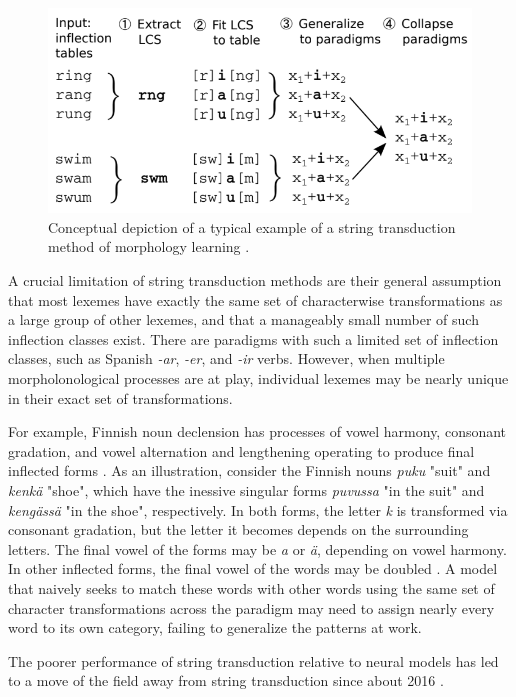 \begin{figure}[ht]
\includegraphics[width=12cm]{images/Hulden2014_diagram.png}
\centering
\caption{Conceptual depiction of a typical example of a string transduction method of morphology learning \parencite{Hulden2014}.}
\end{figure}

A crucial limitation of string transduction methods are their general assumption that most lexemes have exactly the same set of characterwise transformations as a large group of other lexemes, and that a manageably small number of such inflection classes exist. There are paradigms with such a limited set of inflection classes, such as Spanish \textit{-ar}, \textit{-er}, and \textit{-ir} verbs. However, when multiple morpholonological processes are at play, individual lexemes may be nearly unique in their exact set of transformations.

For example, Finnish noun declension has processes of vowel harmony, consonant gradation, and vowel alternation and lengthening operating to produce final inflected forms \parencite{Ranta2008}. As an illustration, consider the Finnish nouns \textit{puku} "suit" and \textit{kenkä} "shoe", which have the inessive singular forms \textit{puvussa} "in the suit" and \textit{kengässä} "in the shoe", respectively. In both forms, the letter \textit{k} is transformed via consonant gradation, but the letter it becomes depends on the surrounding letters. The final vowel of the forms may be \textit{a} or \textit{ä}, depending on vowel harmony. In other inflected forms, the final vowel of the words may be doubled \parencite{Wiktionary}. A model that naively seeks to match these words with other words using the same set of character transformations across the paradigm may need to assign nearly every word to its own category, failing to generalize the patterns at work.

The poorer performance of string transduction relative to neural models has led to a move of the field away from string transduction since about 2016 \parencite{Cotterell2018b}.

